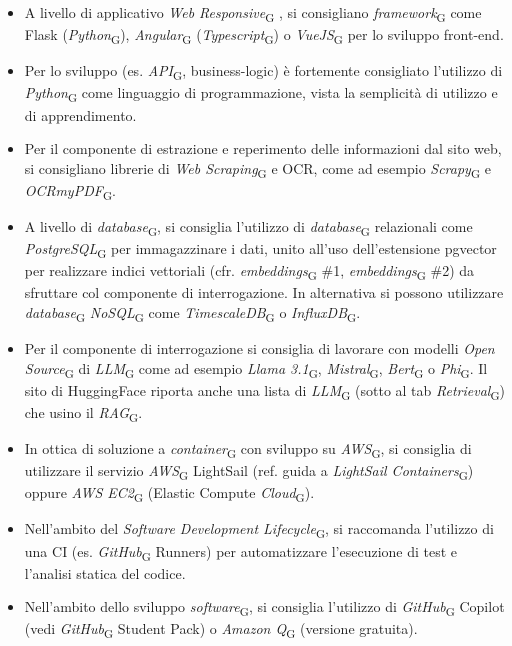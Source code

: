 \begin{itemize}
    \item A livello di applicativo \textit{Web Responsive}\textsubscript{G} , si consigliano \textit{framework}\textsubscript{G} come Flask (\textit{Python}\textsubscript{G}), \textit{Angular}\textsubscript{G}
    (\textit{Typescript}\textsubscript{G}) o \textit{VueJS}\textsubscript{G} per lo sviluppo front-end.
    \item Per lo sviluppo (es. \textit{API}\textsubscript{G}, business-logic) è fortemente consigliato l’utilizzo di \textit{Python}\textsubscript{G} come
    linguaggio di programmazione, vista la semplicità di utilizzo e di apprendimento.
    \item Per il componente di estrazione e reperimento delle informazioni dal sito web, si consigliano
    librerie di \textit{Web Scraping}\textsubscript{G}  e OCR, come ad esempio \textit{Scrapy}\textsubscript{G} e \textit{OCRmyPDF}\textsubscript{G}.
    \item A livello di \textit{database}\textsubscript{G}, si consiglia l’utilizzo di \textit{database}\textsubscript{G} relazionali come \textit{PostgreSQL}\textsubscript{G} per
    immagazzinare i dati, unito all’uso dell’estensione pgvector per realizzare indici vettoriali (cfr.
    \textit{embeddings}\textsubscript{G} \#1, \textit{embeddings}\textsubscript{G} \#2) da sfruttare col componente di interrogazione. In alternativa si
    possono utilizzare \textit{database}\textsubscript{G} \textit{NoSQL}\textsubscript{G} come \textit{TimescaleDB}\textsubscript{G} o \textit{InfluxDB}\textsubscript{G}.
    \item Per il componente di interrogazione si consiglia di lavorare con modelli \textit{Open Source}\textsubscript{G} di \textit{LLM}\textsubscript{G} come
    ad esempio \textit{Llama 3.1}\textsubscript{G}, \textit{Mistral}\textsubscript{G}, \textit{Bert}\textsubscript{G} o \textit{Phi}\textsubscript{G}. Il sito di HuggingFace riporta anche una lista di \textit{LLM}\textsubscript{G}
    (sotto al tab \textit{Retrieval}\textsubscript{G}) che usino il \textit{RAG}\textsubscript{G}.
    \item In ottica di soluzione a \textit{container}\textsubscript{G} con sviluppo su \textit{AWS}\textsubscript{G}, si consiglia di utilizzare il servizio \textit{AWS}\textsubscript{G}
    LightSail (ref. guida a \textit{LightSail Containers}\textsubscript{G}) oppure \textit{AWS EC2}\textsubscript{G} (Elastic Compute \textit{Cloud}\textsubscript{G}).
    \item Nell’ambito del \textit{Software Development Lifecycle}\textsubscript{G}, si raccomanda l’utilizzo di una CI (es. \textit{GitHub}\textsubscript{G}
    Runners) per automatizzare l’esecuzione di test e l’analisi statica del codice.
    \item Nell’ambito dello sviluppo \textit{software}\textsubscript{G}, si consiglia l’utilizzo di \textit{GitHub}\textsubscript{G} Copilot (vedi \textit{GitHub}\textsubscript{G} Student
    Pack) o \textit{Amazon Q}\textsubscript{G} (versione gratuita).
\end{itemize}

